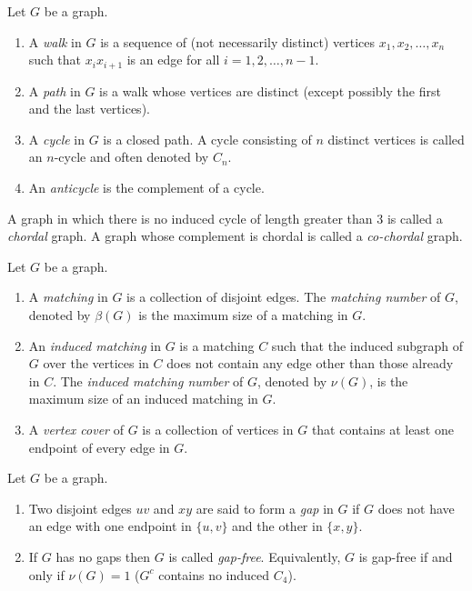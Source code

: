 \documentclass[ALCO,ThmDefs,Unicode,epreuves]{cedram}
\begin{document}
\begin{defi} Let $G$ be a graph.
\begin{enumerate}
\item\label{def2.1_1} A \emph{walk} in $G$ is a sequence of (not necessarily distinct) vertices $x_1,x_2, \dots, x_n$ such that $x_ix_{i+1}$ is an edge for all $i=1,2,\dots,n-1.$
\item\label{def2.1_2} A \emph{path} in $G$ is a walk whose vertices are distinct (except possibly the first and the last vertices).
\item\label{def2.1_3} A \emph{cycle} in $G$ is a closed path. A cycle consisting of $n$ distinct vertices is called an $n$-cycle and often denoted by $C_n.$
\item\label{def2.1_4} An \emph{anticycle} is the complement of a cycle.
\end{enumerate}
\end{defi}

A graph in which there is no induced cycle of length greater than 3 is called a \emph{chordal} graph. A graph whose complement is chordal is called a \emph{co-chordal} graph.

\begin{defi} Let $G$ be a graph.
\begin{enumerate}
\item\label{def2.2_1} A \emph{matching} in $G$ is a collection of disjoint edges. The \emph{matching number} of $G$, denoted by $\beta(G)$ is the maximum size of a matching in $G$.
\item\label{def2.2_2} An \emph{induced matching} in $G$ is a matching $C$ such that the induced subgraph of $G$ over the vertices in $C$ does not contain any edge other than those already in $C$. The \emph{induced matching number} of $G$, denoted by $\nu(G)$, is the maximum size of an induced matching in $G$.
\item\label{def2.2_3} A \emph{vertex cover} of $G$ is a collection of vertices in $G$ that contains at least one endpoint of every edge in $G.$
\end{enumerate}
\end{defi}

\begin{defi}
Let $G$ be a graph.
\begin{enumerate}
\item\label{def2.3_1} Two disjoint edges $uv$ and $xy$ are said to form a \emph{gap} in $G$ if $G$ does not have an edge with one
endpoint in $\{u,v\}$ and the other in $\{x,y\}$.
\item\label{def2.3_2} If $G$ has no gaps then $G$ is called \emph{gap-free}. Equivalently, $G$ is gap-free if and only if $\nu(G) = 1$ (\ie $G^c$ contains no induced $C_4$).
\end{enumerate}
\end{defi}
\end{document}
